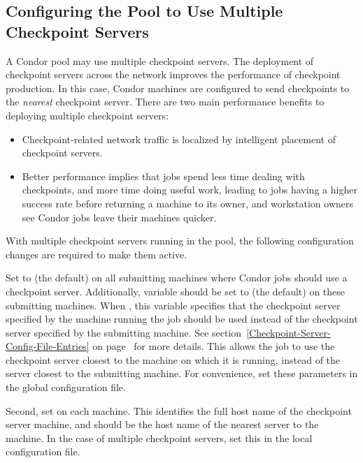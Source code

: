 \subsection{\label{Configure-Multiple-Ckpt-Server} 
Configuring the Pool to Use Multiple Checkpoint Servers}


A Condor pool may use multiple checkpoint servers.
The deployment of
checkpoint servers across the
network improves the performance of checkpoint production.
In this case, Condor machines are configured to send checkpoints to the
\emph{nearest} checkpoint server.
There are two main performance benefits to deploying multiple checkpoint
servers:
\begin{itemize}
\item Checkpoint-related network traffic is localized by
intelligent placement of checkpoint servers.
\item Better performance implies that jobs spend less time
dealing with checkpoints, and more time doing useful work,
leading to jobs having a higher success rate before returning a
machine to its owner, and workstation
owners see Condor jobs leave their machines quicker.
\end{itemize}

With multiple checkpoint servers running in the pool, the
following configuration changes are required to make them active.

Set  to  (the default) on all
submitting machines where Condor jobs should use a checkpoint server.
Additionally, variable  should be set to
 (the default) on these submitting machines.
When , this variable specifies that the checkpoint server
specified by the machine running the job should be used instead of the
checkpoint server specified by the submitting machine.
See section~\ref{Checkpoint-Server-Config-File-Entries} on
page~\pageref{Checkpoint-Server-Config-File-Entries} for more
details.
This allows the job to use the checkpoint server closest to the
machine on which it is running, instead of the server closest to the
submitting machine.
For convenience, set these parameters in the
global configuration file.

Second, set  on each machine.
This identifies the full host name of the checkpoint server machine,
and should be the host name of the nearest server to the machine.
In the case of multiple checkpoint servers, set this
in the local configuration file.

